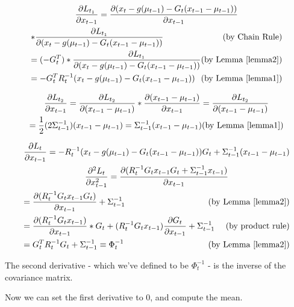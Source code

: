 \begin{multline}
\frac{\partial L_{t_1}}{\partial x_{t-1}} = \frac{\partial (x_t - g(\mu_{t-1}) - G_t (x_{t-1} - \mu_{t-1}))}{\partial x_{t-1}} \\ 
* \frac{\partial L_{t_1}}{\partial (x_t - g(\mu_{t-1}) - G_t (x_{t-1} - \mu_{t-1}))} \hfill \text{(by Chain Rule)} \\
= (-G_t^T) * \frac{\partial L_{t_1}}{\partial (x_t - g(\mu_{t-1}) - G_t (x_{t-1} - \mu_{t-1}))} \hfill \text{(by Lemma \ref{lemma2})} \\
= -G_t^TR_t^{-1}(x_t - g(\mu_{t-1}) - G_t (x_{t-1} - \mu_{t-1})) \hfill \text{(by Lemma \ref{lemma1})}
\end{multline}

\begin{multline}
\frac{\partial L_{t_2}}{\partial x_{t-1}} = \frac{\partial L_{t_2}}{\partial (x_{t-1} - \mu_{t-1})} * \frac{\partial (x_{t-1} - \mu_{t-1})}{\partial x_{t-1}} = \frac{\partial L_{t_2}}{\partial (x_{t-1} - \mu_{t-1})} \\
= \frac{1}{2} (2\Sigma_{t-1}^{-1}) (x_{t-1} - \mu_{t-1}) =  \Sigma_{t-1}^{-1}(x_{t-1} - \mu_{t-1}) \hfill \text{(by Lemma \ref{lemma1})}
\end{multline}

\begin{multline}
\frac{\partial L_t}{\partial x_{t-1}} = -R_t^{-1}(x_t - g(\mu_{t-1}) - G_t (x_{t-1} - \mu_{t-1}))G_t + \Sigma_{t-1}^{-1}(x_{t-1} - \mu_{t-1}) \\
\frac{\partial^2 L_t}{\partial x_{t-1}^2} = \frac{\partial (R_t^{-1}G_tx_{t-1}G_t + \Sigma_{t-1}^{-1}x_{t-1})}{\partial x_{t-1}} \\
= \frac{\partial (R_t^{-1}G_tx_{t-1}G_t)}{\partial x_{t-1}} + \Sigma_{t-1}^{-1} \hfill \text{(by Lemma \ref{lemma2})} \\
= \frac{\partial (R_t^{-1}G_tx_{t-1})}{\partial x_{t-1}}*G_t + (R_t^{-1}G_tx_{t-1}) \frac{\partial G_t}{\partial x_{t-1}} + \Sigma_{t-1}^{-1} \hfill \text{(by product rule)} \\
= G_t^TR_t^{-1}G_t + \Sigma_{t-1}^{-1} \equiv \Phi_t^{-1} \hfill \text{(by Lemma \ref{lemma2})}
\end{multline}

The second derivative - which we've defined to be \(\Phi_t^{-1}\) - is the inverse of the covariance matrix.

Now we can set the first derivative to 0, and compute the mean.

